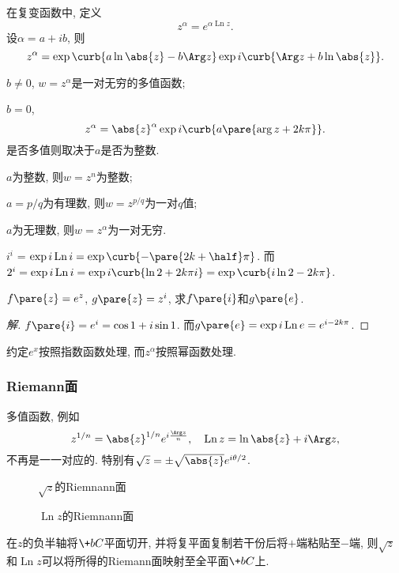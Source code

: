 \documentclass{ctexart}
\DeclareMathOperator{\Ln}{Ln}
\begin{document}
在复变函数中, 定义
\[ z^\alpha = e^{\alpha \Ln z}. \]
设$\alpha = a+ib$, 则
\[ z^\alpha = \exp\curb{a\ln\abs{z} - b\Arg z} \exp i\curb{\Arg z + b\ln\abs{z}}. \]
\begin{cenum}
    \item $b\neq 0$, $w=z^\alpha$是一对无穷的多值函数;
    \item $b = 0$,
    \[ z^\alpha = \abs{z}^\alpha \exp i\curb{a\pare{\arg z + 2k\pi}}. \]
    是否多值则取决于$a$是否为整数.
    \begin{cenum}
        \item $a$为整数, 则$w=z^n$为整数;
        \item $a = p/q$为有理数, 则$w = z^{p/q}$为一对$q$值;
        \item $a$为无理数, 则$w=z^\alpha$为一对无穷.
    \end{cenum}
\end{cenum}
\begin{sample}
    \begin{ex}
        $i^i$ = $\exp i\Ln i = \exp \curb{-\pare{2k+\displaystyle\half}\pi}$. 而$2^i = \exp i\Ln i = \exp i\curb{\ln 2 + 2k\pi i} = \exp\curb{i\ln 2 - 2k\pi}$.
    \end{ex}
\end{sample}
\begin{sample}
    \begin{ex}
        $f\pare{z} = e^z$, $g\pare{z} = z^i$, 求$f\pare{i}$和$g\pare{e}$.
    \end{ex}
    \begin{proof}[解]
        $f\pare{i} = e^i = \cos 1 + i \sin 1$. 而$g\pare{e} = \exp i\Ln e = e^{i-2k\pi}$.
    \end{proof}
\end{sample}
\begin{remark}
    约定$e^x$按照指数函数处理, 而$z^\alpha$按照幂函数处理.
\end{remark}

\subsubsection{Riemann面} %
\label{ssub:riemann面}

多值函数, 例如
\[ z^{1/n} = \abs{z}^{1/n}e^{i\frac{\Arg z}{n}},\quad \Ln z = \ln \abs{z} + i\Arg z, \]
不再是一一对应的. 特别有$\sqrt{z} = \pm \sqrt{\abs{z}}e^{i\theta/2}$.
\begin{figure}[htbp]
    \centering
    \caption{$\sqrt{z}$的Riemnann面}
    \label{fig:sqrtz的Riemnann面}
\end{figure}
\begin{figure}[htbp]
    \centering
    \caption{$\Ln{z}$的Riemnann面}
    \label{fig:lnz的Riemnann面}
\end{figure}
在$z$的负半轴将$\+bC$平面切开, 并将复平面复制若干份后将$+$端粘贴至$-$端, 则$\sqrt{z}$和$\Ln z$可以将所得的Riemann面映射至全平面$\+bC$上.



\end{document}
